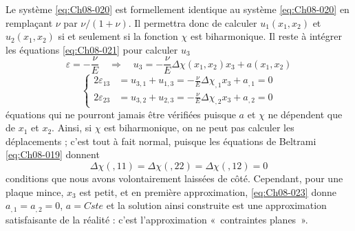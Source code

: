 Le système \eqref{eq:Ch08-020} est formellement identique au système \eqref{eq:Ch08-020} en remplaçant $\nu$ par $\nu/(1+\nu)$.
Il permettra donc de calculer $u_1(x_1,x_2)$ et $u_2(x_1,x_2)$ si et seulement si la fonction $\chi$ est biharmonique.
Il reste à intégrer les équations \eqref{eq:Ch08-021} pour calculer $u_3$ 
\begin{equation}
  \varepsilon = - \frac{\nu}{E} \quad \Rightarrow \quad u_3 = - \frac{\nu}{E} \Delta \chi(x_1,x_2)x_3+a(x_1,x_2)
\label{eq:Ch08-022}
\end{equation}
\begin{equation}
  \begin{cases}
     2 \varepsilon_{13} & = u_{3,1}+u_{1,3}=-\frac{\nu}{E} \Delta \chi_{,1}x_3+a_{,1} = 0 \\
     2 \varepsilon_{23} & = u_{3,2}+u_{2,3}=-\frac{\nu}{E} \Delta \chi_{,2}x_3+a_{,2} = 0
  \end{cases}
\label{eq:Ch08-023}
\end{equation}
équations qui ne pourront jamais être vérifiées puisque $a$ et $\chi$ ne dépendent que de $x_1$ et $x_2$. 
Ainsi, si $\chi$ est biharmonique, on ne peut pas calculer les déplacements ; c'est tout à fait normal, puisque les équations de Beltrami \eqref{eq:Ch08-019} donnent 
\begin{equation}
  \Delta \chi(,11) = \Delta \chi(,22) = \Delta \chi(,12) = 0
\label{eq:Ch08-024}
\end{equation}
conditions que nous avons volontairement laissées de côté.
Cependant, pour une plaque mince, $x_3$ est petit, et en première approximation, \eqref{eq:Ch08-023} donne $a_{,1}=a_{,2}=0$, $a=Cste$ et la solution ainsi construite est une approximation satisfaisante de la réalité : c'est l'approximation «~contraintes planes~».
 
